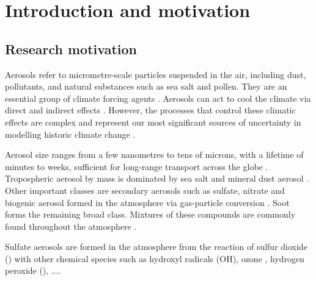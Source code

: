 
\chapter{Introduction and motivation}  %
\label{ch1:title}




\section{Research motivation}

Aerosols refer to micrometre-scale particles suspended in the air, including dust, pollutants, and natural substances such as sea salt and pollen. They are an essential group of climate forcing agents \citep{forsterEarthEnergyBudget2021}. Aerosols can act to cool the climate via direct and indirect effects \citep{angstromAtmosphericTransmissionSun1929, twomeyInfluencePollutionShortwave1977, albrechtAerosolsCloudMicrophysics1989,szopaShortlivedClimateForcers2021}. However, the processes that control these climatic effects are complex and represent our most significant sources of uncertainty in modelling historic climate change \citep{ghanChallengesConstrainingAnthropogenic2016, forsterEarthEnergyBudget2021}.

Aerosol size ranges from a few nanometres to tens of microns, with a lifetime of minutes to weeks, sufficient for long-range transport across the globe \citep{liScatteringAbsorbingAerosols2022}.  Tropospheric aerosol by mass is dominated by sea salt and mineral dust aerosol \citep{szopaShortlivedClimateForcers2021}.  Other important classes are secondary aerosols such as sulfate, nitrate and biogenic aerosol formed in the atmosphere via gas-particle conversion \citep{liScatteringAbsorbingAerosols2022}.  Soot forms the remaining broad class.  Mixtures of these compounds are commonly found throughout the atmosphere \citep[e.g.][]{jimenezEvolutionOrganicAerosols2009, bauerTurningPointAerosol2022}. 

Sulfate aerosols are formed in the atmosphere from the reaction of sulfur dioxide () with other chemical species such as hydroxyl radicals (OH), ozone , hydrogen peroxide (), ....  

